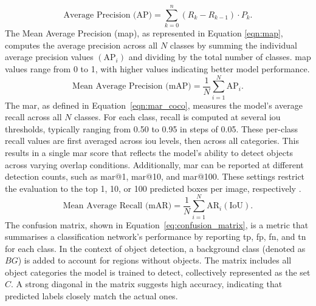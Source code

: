 \begin{equation}
\text{Average Precision (AP)} = \sum_{k=0}^{n} (R_k - R_{k-1}) \cdot P_k.
\label{eqn:average_precision}
\end{equation}
\noindent
The Mean Average Precision (\gls{map}), as represented in Equation \ref{eqn:map}, computes the average precision across all \( N \) classes by summing the individual average precision values \( (\text{AP}_i) \) and dividing by the total number of classes. \gls{map} values range from 0 to 1, with higher values indicating better model performance.
\begin{equation}
\text{Mean Average Precision (mAP)} = \frac{1}{N} \sum_{i=1}^{N} \text{AP}_i.
\label{eqn:map}
\end{equation}
\noindent
The \gls{mar}, as defined in Equation~\ref{eqn:mar_coco}, measures the model's average recall across all \( N \) classes. For each class, recall is computed at several \gls{iou} thresholds, typically ranging from 0.50 to 0.95 in steps of 0.05. These per-class recall values are first averaged across \gls{iou} levels, then across all categories. This results in a single \gls{mar} score that reflects the model's ability to detect objects across varying overlap conditions. Additionally, \gls{mar} can be reported at different detection counts, such as \gls{mar}@1, \gls{mar}@10, and \gls{mar}@100. These settings restrict the evaluation to the top 1, 10, or 100 predicted boxes per image, respectively \cite{coco}.
\begin{equation}
\text{Mean Average Recall (mAR)} = \frac{1}{N} \sum_{i=1}^{N} \text{AR}_i(\text{IoU}).
\label{eqn:mar_coco}
\end{equation}
\noindent
The confusion matrix, shown in Equation~\ref{eq:confusion_matrix}, is a metric that summarises a classification network’s performance by reporting \gls{tp}, \gls{fp}, \gls{fn}, and \gls{tn} for each class. In the context of object detection, a background class (denoted as \( BG \)) is added to account for regions without objects. The matrix includes all object categories the model is trained to detect, collectively represented as the set \( C \). A strong diagonal in the matrix suggests high accuracy, indicating that predicted labels closely match the actual ones.
